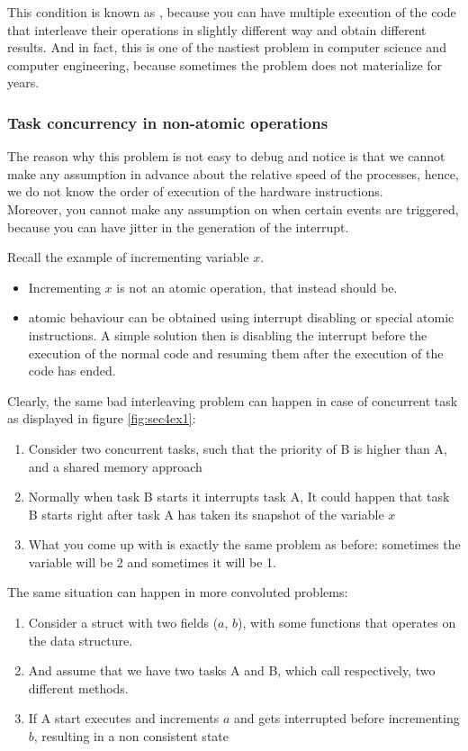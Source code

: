 This condition is known as , because you can have multiple execution of the code that interleave their operations in slightly different way and obtain different results. And in fact, this is one of the nastiest problem in computer science and computer engineering, because sometimes the problem does not materialize for years.

\subsubsection{Task concurrency in non-atomic operations}
The reason why this problem is not easy to debug and notice is that we cannot make any assumption in advance about the relative speed of the processes, hence, we do not know the order of execution of the hardware instructions.\\
Moreover, you cannot make any assumption on when certain events are triggered, because you can have jitter in the generation of the interrupt. 

Recall the example of incrementing variable $x$. 
\begin{itemize}
\item Incrementing $x$ is not an atomic operation, that instead should be.
\item atomic behaviour can be obtained using interrupt disabling or special atomic instructions. A simple solution then is disabling the interrupt before the execution of the normal code and resuming them after the execution of the code has ended.
\end{itemize}

Clearly, the same bad interleaving problem can happen in case of concurrent task as displayed in figure \ref{fig:sec4ex1}:
\begin{enumerate}
\item Consider two concurrent tasks, such that the priority of B is higher than A, and a shared memory approach
\item Normally when task B starts it interrupts task A, It could happen that task B starts right after task A has taken its snapshot of the variable $x$
\item What you come up with is exactly the same problem as before: sometimes the variable will be 2 and sometimes it will be 1.
\end{enumerate}


The same situation can happen in more convoluted problems:
\begin{enumerate}
\item Consider a struct with two fields ($a$, $b$), with some functions that operates on the data structure.
\item And assume that we have two tasks A and B, which call respectively, two different methods.
\item If A start executes and increments $a$ and gets interrupted before incrementing $b$, resulting in a non consistent state
\end{enumerate}

